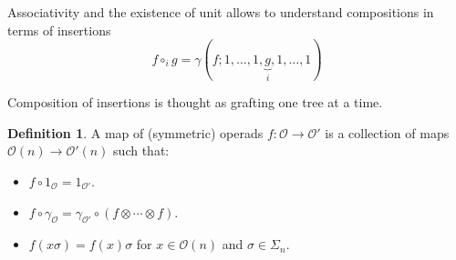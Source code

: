 \documentclass{beamer}
\theoremstyle{definition}
\newtheorem{defi}{Definition}
\begin{document}
\begin{frame}
	Associativity and the existence of unit allows to understand compositions in terms of insertions $$f\circ_i g=\gamma(f;1,\dots, 1,\underbrace{g}_{i},1,\dots, 1)$$ \pause
	
	Composition of insertions is thought as grafting one tree at a time.
\end{frame}
\begin{frame}
	\begin{defi}
	 A map of (symmetric) operads $f:\mathcal{O}\to \mathcal{O}'$ is a collection of maps $\mathcal{O}(n)\to \mathcal{O}'(n)$ such that:
		\begin{itemize}
			\item<1->   $f\circ 1_\mathcal{O}=1_{\mathcal{O}'}$.
			\item<2->  $f\circ \gamma_\mathcal{O}=\gamma_{\mathcal{O}'}\circ (f\otimes\cdots\otimes f)$.
			\item<3->   $f(x\sigma)=f(x)\sigma$ for $x\in\mathcal{O}(n)$ and $\sigma\in\Sigma_n$.
		\end{itemize}
	\end{defi}
	
	
\end{frame}
%	
\end{document}
